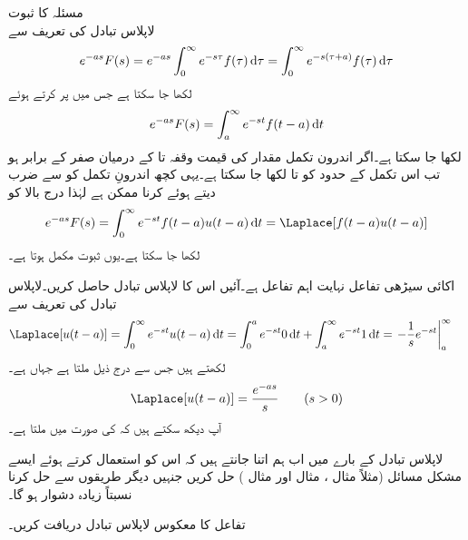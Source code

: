 \quad مسئلہ  کا ثبوت\\
لاپلاس تبادل کی تعریف سے 
\begin{align*}
e^{-as}F(s)=e^{-as}\int_{0}^{\infty}e^{-s\tau}f(\tau)\dif \tau=\int_{0}^{\infty}e^{-s(\tau+a)}f(\tau)\dif \tau
\end{align*}
لکھا جا سکتا ہے جس میں  پر کرتے ہوئے
\begin{align*}
e^{-as}F(s)=\int_{a}^{\infty}e^{-st}f(t-a)\dif t
\end{align*}
لکھا جا سکتا ہے۔اگر اندرون تکمل مقدار کی قیمت وقفہ  تا  کے درمیان صفر کے برابر ہو تب  اس تکمل کے حدود  کو  تا  لکھا جا سکتا ہے۔یہی کچھ اندرونِ تکمل کو  سے ضرب دیتے ہوئے کرنا ممکن ہے لہٰذا درج بالا کو 
\begin{align*}
e^{-as}F(s)=\int_{0}^{\infty}e^{-st}f(t-a)u(t-a)\dif t=\Laplace[f(t-a)u(t-a)]
\end{align*}
لکھا جا سکتا ہے۔یوں ثبوت مکمل ہوتا ہے۔

اکائی سیڑھی تفاعل نہایت اہم تفاعل ہے۔آئیں اس کا لاپلاس تبادل حاصل کریں۔لاپلاس تبادل کی تعریف سے
\begin{align*}
\Laplace[u(t-a)]&=\int_{0}^{\infty} e^{-st}u(t-a)\dif t=\int_{0}^{a}e^{-st} 0 \dif t+\int_{a}^{\infty}e^{-st} 1\dif t=\left. -\frac{1}{s}e^{-st}\right|_{a}^{\infty}
\end{align*}
لکھتے ہیں جس سے درج ذیل ملتا ہے جہاں  ہے۔
\begin{align}\label{مساوات_لاپلاس_اکائی_سیڑھی}
\Laplace[u(t-a)]=\frac{e^{-as}}{s}\quad \quad (s>0)
\end{align}
آپ دیکھ سکتے ہیں کہ  کی صورت میں  ملتا ہے۔

لاپلاس تبادل کے بارے میں اب ہم اتنا جانتے ہیں کہ اس کو استعمال کرتے ہوئے ایسے مشکل مسائل  (مثلاً مثال ، مثال  اور مثال ) حل کریں جنہیں دیگر طریقوں سے حل کرنا نسبتاً زیادہ دشوار ہو گا۔

تفاعل  کا معکوس لاپلاس تبادل دریافت کریں۔

